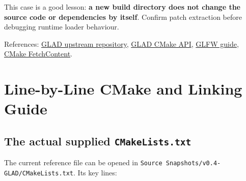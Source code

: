 \documentclass[
  10pt,
  a4paper,
]{article}
\begin{document}
This case is a good lesson: \textbf{a new build directory does not
change the source code or dependencies by itself}. Confirm patch
extraction before debugging runtime loader behaviour.

References: \href{https://github.com/Dav1dde/glad}{GLAD upstream
repository},
\href{https://github.com/Dav1dde/glad/blob/glad2/cmake/GladConfig.cmake}{GLAD
CMake API},
\href{https://www.glfw.org/docs/latest/quick_guide.html}{GLFW guide},
\href{https://cmake.org/cmake/help/latest/module/FetchContent.html}{CMake
FetchContent}.

\newpage

\section{Line-by-Line CMake and Linking
Guide}\label{line-by-line-cmake-and-linking-guide}

\subsection{\texorpdfstring{The actual supplied
\texttt{CMakeLists.txt}}{The actual supplied CMakeLists.txt}}\label{the-actual-supplied-cmakelists.txt}

The current reference file can be opened in
\texttt{Source\ Snapshots/v0.4-GLAD/CMakeLists.txt}. Its key lines:
\end{document}

